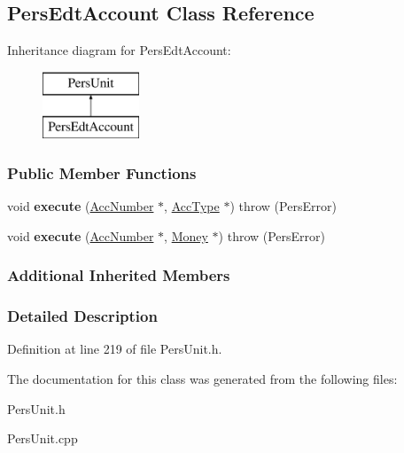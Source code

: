 \hypertarget{classPersEdtAccount}{\subsection{Pers\-Edt\-Account Class Reference}
\label{d9/d3d/classPersEdtAccount}
}
Inheritance diagram for Pers\-Edt\-Account\-:\begin{figure}[H]
\begin{center}
\leavevmode
\includegraphics[height=2.000000cm]{d9/d3d/classPersEdtAccount}
\end{center}
\end{figure}
\subsubsection*{Public Member Functions}
\begin{DoxyCompactItemize}
\item 
\hypertarget{classPersEdtAccount_ad6ee8ffd77bd4e6e169c2cc1aca39619}{void {\bfseries execute} (\hyperlink{classAccNumber}{Acc\-Number} $\ast$, \hyperlink{classUsrType}{Acc\-Type} $\ast$)  throw (\-Pers\-Error)}\label{d9/d3d/classPersEdtAccount_ad6ee8ffd77bd4e6e169c2cc1aca39619}

\item 
\hypertarget{classPersEdtAccount_aacdc72e8ee1842be9516d0a17c043460}{void {\bfseries execute} (\hyperlink{classAccNumber}{Acc\-Number} $\ast$, \hyperlink{classMoney}{Money} $\ast$)  throw (\-Pers\-Error)}\label{d9/d3d/classPersEdtAccount_aacdc72e8ee1842be9516d0a17c043460}

\end{DoxyCompactItemize}
\subsubsection*{Additional Inherited Members}


\subsubsection{Detailed Description}


Definition at line 219 of file Pers\-Unit.\-h.



The documentation for this class was generated from the following files\-:\begin{DoxyCompactItemize}
\item 
Pers\-Unit.\-h\item 
Pers\-Unit.\-cpp\end{DoxyCompactItemize}
